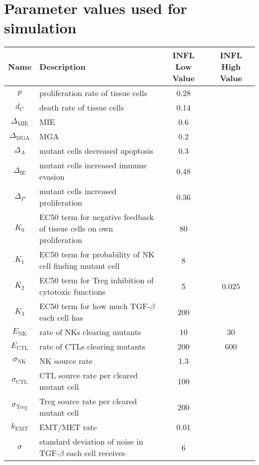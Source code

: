 \documentclass[11pt, a4paper, preprint]{article}
\begin{document}
\section{Parameter values used for simulation}

\begin{table}[H]
\begin{center}
 \begin{tabular}{|| c | p{7cm} | c | c ||} 
 \hline
 Name & Description & INFL Low Value & INFL High Value  \\ [0.5ex] 
 \hline\hline
  $p$ & proliferation rate of tissue cells & 0.28 & \\ 
 \hline
 $d_C$  & death rate of tissue cells & 0.14 & \\
 \hline
$\Delta_\text{MIE}$ &  MIE & 0.6 & \\
 \hline
 $\Delta_\text{MGA}$ & MGA  & 0.2 &  \\
 \hline
  $\Delta_A$ & mutant cells decreased apoptosis & 0.3 &  \\
  \hline
  $\Delta_\text{IE}$ & mutant cells increased immune evasion & 0.48 &  \\
  \hline
  $\Delta_P$ & mutant cells increased proliferation & 0.36 &  \\
  \hline
 $K_0$ & EC50 term for negative feedback of tissue cells on own proliferation & 80 & \\
 \hline
 $K_1$ & EC50 term for probability of NK cell finding mutant cell & 8 & \\
 \hline
  $K_2$ & EC50 term for Treg inhibition of cytotoxic functions & 5 & 0.025  \\
  \hline
  $K_3$ & EC50 term for how much TGF-$\beta$ each cell has & 200 & \\
  \hline
 $E_\text{NK}$ & rate of NKs clearing mutants & 10 & 30  \\
  \hline
  $E_\text{CTL}$ & rate of CTLs clearing mutants & 200 & 600 \\
  \hline
  $\sigma_\text{NK}$ & NK source rate & 1.3 &  \\ 
  \hline
  $\sigma_\text{CTL}$ & CTL source rate per cleared mutant cell & 100 & \\ 
  \hline
  $\sigma_\text{Treg}$ & Treg source rate per cleared mutant cell & 200 & \\ 
  \hline
  $k_\text{EMT}$ & EMT/MET rate & 0.01 & \\
  \hline
  $\sigma$ & standard deviation of noise in TGF-$\beta$ each cell receives & 6 & \\
  \hline

\end{tabular}
\end{center}
\end{table}
\end{document}
